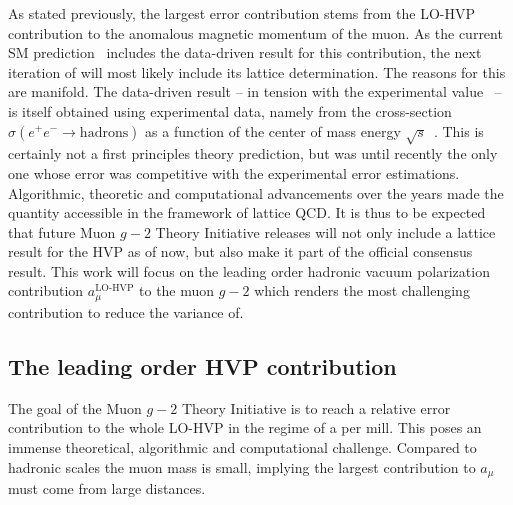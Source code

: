 As stated previously, the largest error contribution stems from the LO-HVP contribution to the anomalous magnetic momentum of the muon.
As the current SM prediction~\cite{snowmass:2020} includes the data-driven result for this contribution, the next iteration of will most likely include its lattice determination.
The reasons for this are manifold.
The data-driven result -- in tension with the experimental value~\cite{Muong-2:2006rrc,Muong-2:2021ojo} -- is itself obtained using experimental data, namely from the cross-section $\sigma(e^{+} e^{-} \rightarrow \text{hadrons})$ as a function of the center of mass energy $\sqrt{s}$~\cite{davier:2017zfy,keshavarzi:2018mgv,colangelo:2018mtw,hoferichter:2019mqg,davier:2019can,keshavarzi:2019abf}.
This is certainly not a first principles theory prediction, but was until recently the only one whose error was competitive with the experimental error estimations.
Algorithmic, theoretic and computational advancements over the years made the quantity accessible in the framework of lattice QCD.
It is thus to be expected that future Muon $g-2$ Theory Initiative releases will not only include a lattice result for the HVP as of now, but also make it part of the official consensus result.
This work will focus on the leading order hadronic vacuum polarization contribution $a_{\mu}^{\text{LO-HVP}}$ to the muon $g-2$ which renders the most challenging contribution to reduce the variance of.

\subsection{The leading order HVP contribution}
\label{sec:lohvp}

The goal of the Muon $g-2$ Theory Initiative is to reach a relative error contribution to the whole LO-HVP in the regime of a per mill.
This poses an immense theoretical, algorithmic and computational challenge.
Compared to hadronic scales the muon mass is small, implying the largest contribution to $a_{\mu}$ must come from large distances.

